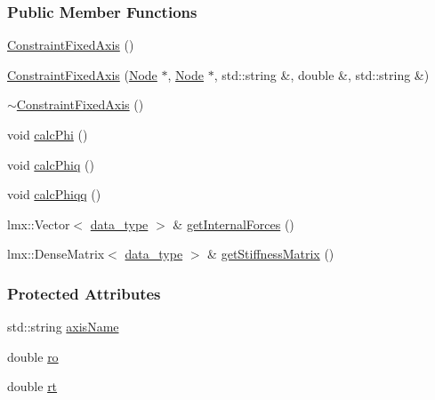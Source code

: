 \subsubsection*{Public Member Functions}
\begin{DoxyCompactItemize}
\item 
\hyperlink{classmknix_1_1_constraint_fixed_axis_ab385ca1886eda260208173abcfde6eaf}{Constraint\-Fixed\-Axis} ()
\item 
\hyperlink{classmknix_1_1_constraint_fixed_axis_aa12bf0a882d86295d28d6c414c4a9d5e}{Constraint\-Fixed\-Axis} (\hyperlink{classmknix_1_1_node}{Node} $\ast$, \hyperlink{classmknix_1_1_node}{Node} $\ast$, std\-::string \&, double \&, std\-::string \&)
\item 
\hyperlink{classmknix_1_1_constraint_fixed_axis_a51f651cd9693210d991b6b16b28a94c9}{$\sim$\-Constraint\-Fixed\-Axis} ()
\item 
void \hyperlink{classmknix_1_1_constraint_fixed_axis_ab5f59fd55877e45184aa90787479415c}{calc\-Phi} ()
\item 
void \hyperlink{classmknix_1_1_constraint_fixed_axis_a40970d2c0103244ac5e75307247d25b9}{calc\-Phiq} ()
\item 
void \hyperlink{classmknix_1_1_constraint_fixed_axis_a10444d42c4401cf093b221d59354ab8b}{calc\-Phiqq} ()
\item 
lmx\-::\-Vector$<$ \hyperlink{namespacemknix_a16be4b246fbf2cceb141e3a179111020}{data\-\_\-type} $>$ \& \hyperlink{classmknix_1_1_constraint_fixed_axis_aad38af4a1571f59aa0e414109fd64275}{get\-Internal\-Forces} ()
\item 
lmx\-::\-Dense\-Matrix$<$ \hyperlink{namespacemknix_a16be4b246fbf2cceb141e3a179111020}{data\-\_\-type} $>$ \& \hyperlink{classmknix_1_1_constraint_fixed_axis_aa2b8d2151a36dd140285a5a5e4f16967}{get\-Stiffness\-Matrix} ()
\end{DoxyCompactItemize}
\subsubsection*{Protected Attributes}
\begin{DoxyCompactItemize}
\item 
std\-::string \hyperlink{classmknix_1_1_constraint_fixed_axis_a71a1a8d7efc201a678dbfececa068ecb}{axis\-Name}
\item 
double \hyperlink{classmknix_1_1_constraint_fixed_axis_aaef8888c92c6fcba5d4644ab0cc8c984}{ro}
\item 
double \hyperlink{classmknix_1_1_constraint_fixed_axis_aae85721e0c2a16397b98fdb09ba72361}{rt}
\end{DoxyCompactItemize}


